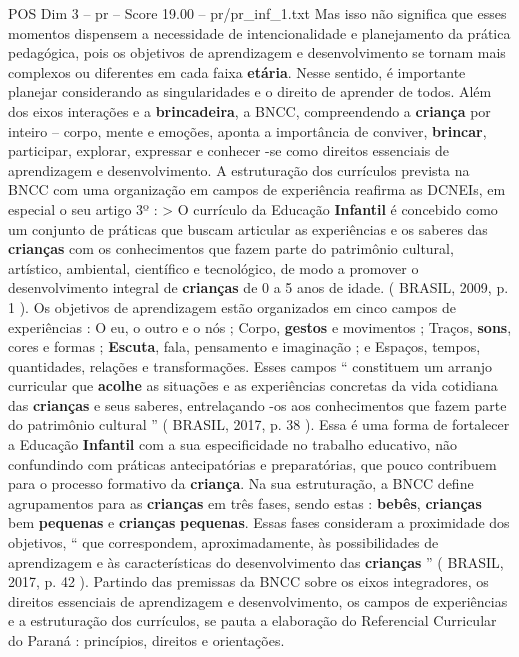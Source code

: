 \begin{textsample}{POS Dim 3 – pr – Score 19.00 – pr/pr\_inf\_1.txt}
Mas isso não significa que esses momentos dispensem a necessidade de intencionalidade e planejamento da prática pedagógica, pois os objetivos de aprendizagem e desenvolvimento se tornam mais complexos ou diferentes em cada faixa \textbf{etária}.
Nesse sentido, é importante planejar considerando as singularidades e o direito de aprender de todos.
Além dos eixos interações e a \textbf{brincadeira}, a BNCC, compreendendo a \textbf{criança} por inteiro – corpo, mente e emoções, aponta a importância de conviver, \textbf{brincar}, participar, explorar, expressar e conhecer -se como direitos essenciais de aprendizagem e desenvolvimento.
A estruturação dos currículos prevista na BNCC com uma organização em campos de experiência reafirma as DCNEIs, em especial o seu artigo 3º : > O currículo da Educação \textbf{Infantil} é concebido como um conjunto de práticas que buscam articular as experiências e os saberes das \textbf{crianças} com os conhecimentos que fazem parte do patrimônio cultural, artístico, ambiental, científico e tecnológico, de modo a promover o desenvolvimento integral de \textbf{crianças} de 0 a 5 anos de idade. ( BRASIL, 2009, p. 1 ).
Os objetivos de aprendizagem estão organizados em cinco campos de experiências : O eu, o outro e o nós ; Corpo, \textbf{gestos} e movimentos ; Traços, \textbf{sons}, cores e formas ; \textbf{Escuta}, fala, pensamento e imaginação ; e Espaços, tempos, quantidades, relações e transformações.
Esses campos “ constituem um arranjo curricular que \textbf{acolhe} as situações e as experiências concretas da vida cotidiana das \textbf{crianças} e seus saberes, entrelaçando -os aos conhecimentos que fazem parte do patrimônio cultural ” ( BRASIL, 2017, p. 38 ).
Essa é uma forma de fortalecer a Educação \textbf{Infantil} com a sua especificidade no trabalho educativo, não confundindo com práticas antecipatórias e preparatórias, que pouco contribuem para o processo formativo da \textbf{criança}.
Na sua estruturação, a BNCC define agrupamentos para as \textbf{crianças} em três fases, sendo estas : \textbf{bebês}, \textbf{crianças} bem \textbf{pequenas} e \textbf{crianças} \textbf{pequenas}.
Essas fases consideram a proximidade dos objetivos, “ que correspondem, aproximadamente, às possibilidades de aprendizagem e às características do desenvolvimento das \textbf{crianças} ” ( BRASIL, 2017, p. 42 ).
Partindo das premissas da BNCC sobre os eixos integradores, os direitos essenciais de aprendizagem e desenvolvimento, os campos de experiências e a estruturação dos currículos, se pauta a elaboração do Referencial Curricular do Paraná : princípios, direitos e orientações.

\end{textsample}
